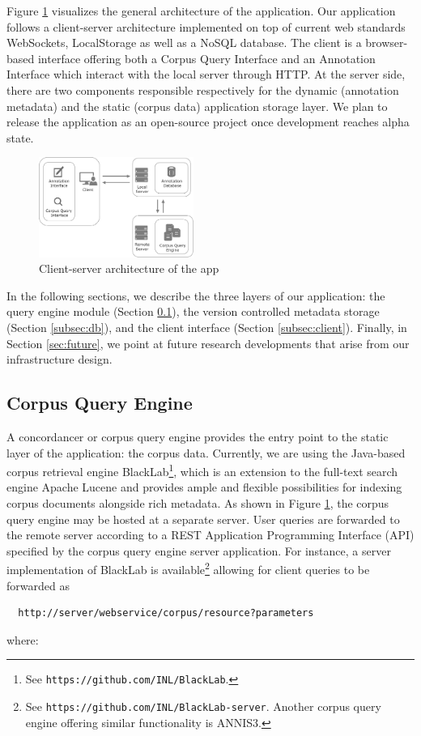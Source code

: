 \documentclass{sig-alternate}
\begin{document}
Figure \ref{fig:app} visualizes the general architecture of the application.
Our application follows a client-server architecture implemented on top of current web standards
\textemdash WebSockets, LocalStorage \textemdash as well as a NoSQL database.
The client is a browser-based interface offering both a Corpus Query Interface and an Annotation
Interface which interact with the local server through HTTP.
At the server side, there are two components responsible respectively for the dynamic (annotation
metadata) and the static (corpus data) application storage layer. We plan to release the
application as an open-source project once development reaches alpha state.

\begin{figure}
  \centering
  \includegraphics[width=0.45\textwidth]{./img/app-remote.pdf}
  \caption{\label{fig:app}Client-server architecture of the app}
\end{figure}

In the following sections, we describe the three layers of our application: the query engine module
(Section \ref{subsec:conc}), the version controlled metadata storage (Section \ref{subsec:db}),
and the client interface (Section \ref{subsec:client}). Finally, in Section \ref{sec:future},
we point at future research developments that arise from our infrastructure design.

\subsection{Corpus Query Engine}\label{subsec:conc}
A concordancer or corpus query engine provides the entry point to the static layer of the
application: the corpus data. Currently, we are using the Java-based corpus retrieval engine
BlackLab\footnote{
  See \texttt{https://github.com/INL/BlackLab}.
}, which is an extension to the full-text search engine Apache Lucene and provides ample and
flexible possibilities for indexing corpus documents alongside rich metadata.
As shown in Figure \ref{fig:app}, the corpus query engine may be hosted at a separate server.
User queries are forwarded to the remote server according to a REST Application Programming
Interface (API) specified by the corpus query engine server application.
For instance, a server implementation of BlackLab is available\footnote{
  See \texttt{https://github.com/INL/BlackLab-server}. Another corpus query engine offering similar
  functionality is ANNIS3.
} allowing for client queries to be forwarded as
\begin{verbatim}
  http://server/webservice/corpus/resource?parameters
\end{verbatim}
where:
\end{document}
